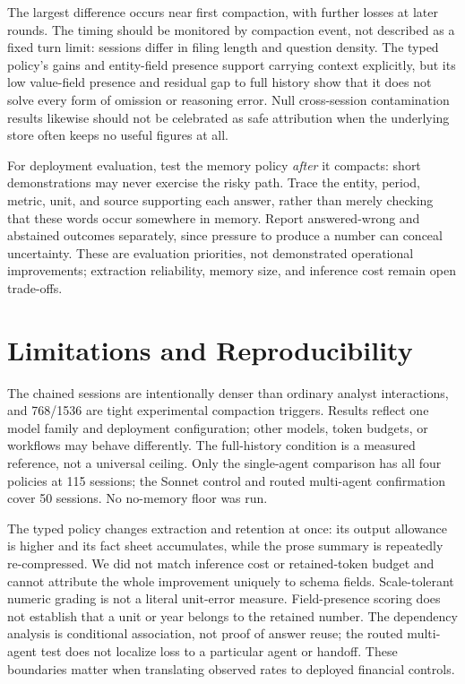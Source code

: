 \documentclass[conference,a4paper]{IEEEtran}
\begin{document}
The largest difference occurs near first compaction, with further losses at later rounds. The timing should be monitored by compaction event, not described as a fixed turn limit: sessions differ in filing length and question density. The typed policy's gains and entity-field presence support carrying context explicitly, but its low value-field presence and residual gap to full history show that it does not solve every form of omission or reasoning error. Null cross-session contamination results likewise should not be celebrated as safe attribution when the underlying store often keeps no useful figures at all.

For deployment evaluation, test the memory policy \emph{after} it compacts: short demonstrations may never exercise the risky path. Trace the entity, period, metric, unit, and source supporting each answer, rather than merely checking that these words occur somewhere in memory. Report answered-wrong and abstained outcomes separately, since pressure to produce a number can conceal uncertainty. These are evaluation priorities, not demonstrated operational improvements; extraction reliability, memory size, and inference cost remain open trade-offs.

\section{Limitations and Reproducibility}
\label{sec:limitations}

The chained sessions are intentionally denser than ordinary analyst interactions, and 768/1536 are tight experimental compaction triggers. Results reflect one model family and deployment configuration; other models, token budgets, or workflows may behave differently. The full-history condition is a measured reference, not a universal ceiling. Only the single-agent comparison has all four policies at 115 sessions; the Sonnet control and routed multi-agent confirmation cover 50 sessions. No no-memory floor was run.

The typed policy changes extraction and retention at once: its output allowance is higher and its fact sheet accumulates, while the prose summary is repeatedly re-compressed. We did not match inference cost or retained-token budget and cannot attribute the whole improvement uniquely to schema fields. Scale-tolerant numeric grading is not a literal unit-error measure. Field-presence scoring does not establish that a unit or year belongs to the retained number. The dependency analysis is conditional association, not proof of answer reuse; the routed multi-agent test does not localize loss to a particular agent or handoff. These boundaries matter when translating observed rates to deployed financial controls.
\end{document}
